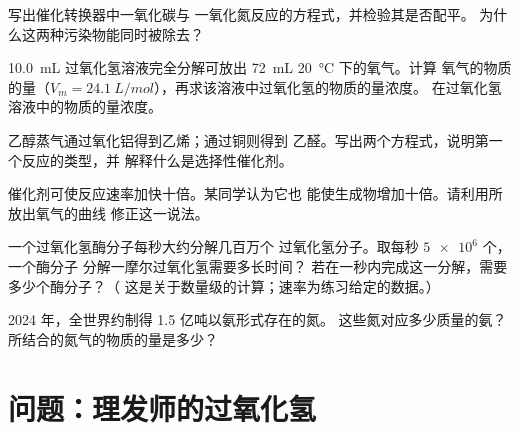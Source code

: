 \begin{exercise}[$\star\star$]\label{exo:g12:catalysis:10}
写出催化转换器中一氧化碳与
一氧化氮反应的方程式，并检验其是否配平。
为什么这两种污染物能同时被除去？
\end{exercise}

\begin{exercise}[$\star\star$]\label{exo:g12:catalysis:11}
\qty{10.0}{mL} 过氧化氢溶液完全分解可放出 \qty{72}{mL}
\qty{20}{\celsius} 下的氧气。计算
氧气的物质的量（$V_m = \qty{24.1}{L/mol}$），再求该溶液中过氧化氢的物质的量浓度。
在过氧化氢溶液中的物质的量浓度。
\end{exercise}

\begin{exercise}[$\star\star\star$]\label{exo:g12:catalysis:12}
乙醇蒸气通过氧化铝得到乙烯；通过铜则得到
乙醛。写出两个方程式，说明第一个反应的类型，并
解释什么是选择性催化剂。
\end{exercise}

\begin{exercise}[$\star\star\star$]\label{exo:g12:catalysis:13}
催化剂可使反应速率加快十倍。某同学认为它也
能使生成物增加十倍。请利用所放出氧气的曲线
修正这一说法。
\end{exercise}

\begin{exercise}[$\star\star\star$]\label{exo:g12:catalysis:14}
一个过氧化氢酶分子每秒大约分解几百万个
过氧化氢分子。取每秒 $\num{5e6}$ 个，一个酶分子
分解一摩尔过氧化氢需要多长时间？
若在一秒内完成这一分解，需要多少个酶分子？（
这是关于数量级的计算；速率为练习给定的数据。）
\end{exercise}

\begin{exercise}[$\star\star\star$]\label{exo:g12:catalysis:15}
2024 年，全世界约制得 1.5 亿吨以氨形式存在的氮。
这些氮对应多少质量的氨？所结合的氮气的物质的量是多少？
\end{exercise}

\section{问题：理发师的过氧化氢}

